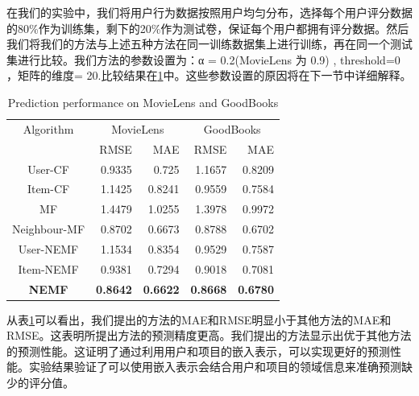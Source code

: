 \documentclass[lang=cn,11pt]{elegantpaper}
\begin{document}
在我们的实验中，我们将用户行为数据按照用户均匀分布，选择每个用户评分数据的80\%作为训练集，剩下的20\%作为测试卷，保证每个用户都拥有评分数据。然后我们将我们的方法与上述五种方法在同一训练数据集上进行训练，再在同一个测试集进行比较。我们方法的参数设置为：α = 0.2(MovieLens 为 0.9) , threshold=0 ，矩阵的维度= 20.比较结果在\ref{tab:result}中。这些参数设置的原因将在下一节中详细解释。

\begin{table}[tbp]
	\centering
	\caption{Prediction performance on MovieLens and GoodBooks \label{tab:result}}
	\setlength{\tabcolsep}{7mm}
	
	\begin{tabular}{ccrrrr}
		\toprule
		\multicolumn{ 2}{c}{Algorithm} & \multicolumn{ 2}{c}{MovieLens} & \multicolumn{ 2}{c}{GoodBooks} \\
		
		\multicolumn{ 2}{c}{} &       RMSE &        MAE &       RMSE &        MAE \\
		\midrule
		
		\multicolumn{ 2}{c}{User-CF} &     0.9335 &      0.725 &     1.1657 &     0.8209 \\
		
		\multicolumn{ 2}{c}{Item-CF} &     1.1425 &     0.8241 &     0.9559 &     0.7584 \\
		
		\multicolumn{ 2}{c}{MF} &     1.4479 &     1.0255 &     1.3978 &     0.9972 \\
		
		\multicolumn{ 2}{c}{Neighbour-MF} &     0.8702 &    0.6673&    0.8788 &     0.6702 \\
		
		\multicolumn{ 2}{c}{User-NEMF} &     1.1534 &     0.8354 &     0.9529 &     0.7587 \\
		
		\multicolumn{ 2}{c}{Item-NEMF} &     0.9381 &     0.7294 &     0.9018 &     0.7081 \\
		
		\multicolumn{ 2}{c}{\textbf{NEMF}} &     \textbf{0.8642} &     \textbf{0.6622} &     \textbf{0.8668} &     \textbf{0.6780} \\
		\bottomrule
	\end{tabular} 	
\end{table}

从表\ref{tab:result}可以看出，我们提出的方法的MAE和RMSE明显小于其他方法的MAE和RMSE。这表明所提出方法的预测精度更高。我们提出的方法显示出优于其他方法的预测性能。这证明了通过利用用户和项目的嵌入表示，可以实现更好的预测性能。实验结果验证了可以使用嵌入表示会结合用户和项目的领域信息来准确预测缺少的评分值。
\end{document}

